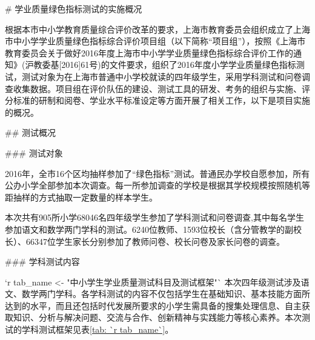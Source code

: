 # 学业质量绿色指标测试的实施概况

根据本市中小学教育质量综合评价改革的要求，上海市教育委员会组织成立了上海市中小学学业质量绿色指标综合评价项目组（以下简称“项目组”），按照《上海市教育委员会关于做好2016年度上海市中小学学业质量绿色指标综合评价工作的通知》(沪教委基[2016]61号)的文件要求，组织了2016年度小学学业质量绿色指标测试，测试对象为在上海市普通中小学校就读的四年级学生，采用学科测试和问卷调查收集数据。项目组在评价队伍的建设、测试工具的研发、考务的组织与实施、评分标准的研制和阅卷、学业水平标准设定等方面开展了相关工作，以下是项目实施的概况。

## 测试概况

### 测试对象

2016年，全市16个区均抽样参加了“绿色指标”测试。普通民办学校自愿参加，所有公办小学全部参加本次调查。每一所参加调查的学校是根据其学校规模按照随机等距抽样的方式抽取一定数量的样本学生。

本次共有905所小学68046名四年级学生参加了学科测试和问卷调查,其中每名学生参加语文和数学两门学科的测试。6240位教师、1593位校长（含分管教学的副校长）、66347位学生家长分别参加了教师问卷、校长问卷及家长问卷的调查。

### 学科测试内容

`r tab_name <- "中小学生学业质量测试科目及测试框架"`
本次四年级测试涉及语文、数学两门学科。各学科测试的内容不仅包括学生在基础知识、基本技能方面所达到的水平，而且还包括时代发展所要求的小学生需具备的搜集处理信息、自主获取知识、分析与解决问题、交流与合作、创新精神与实践能力等核心素养。本次测试的学科测试框架见表\ref{tab: `r tab_name`}。

